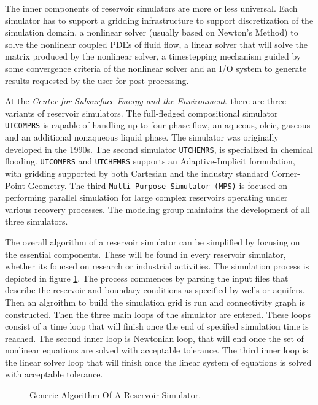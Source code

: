 The inner components of reservoir simulators are more or less universal. Each simulator has to support a 
gridding infrastructure to support discretization of the simulation domain, a nonlinear solver (usually based on Newton's Method) to 
solve the nonlinear coupled PDEs of fluid flow, a linear solver that will solve the matrix produced by the nonlinear solver, a timestepping
mechanism guided by some convergence criteria of the nonlinear solver and an I/O system to generate results requested by the user for post-processing.

At the \textit{Center for Subsurface Energy and the Environment}, there are three variants of reservoir simulators. The full-fledged compositional 
simulator \texttt{UTCOMPRS} is capable of handling up to four-phase flow, an aqueous, oleic, gaseous and an additional nonaqueous liquid phase. 
The simulator was originally developed in the 1990s\supercite{utcomp}. The second simulator \texttt{UTCHEMRS}, is specialized in chemical flooding.
\texttt{UTCOMPRS} and \texttt{UTCHEMRS} supports an Adaptive-Implicit formulation, with gridding supported by both Cartesian and the industry standard
Corner-Point Geometry. The third \texttt{Multi-Purpose Simulator (MPS)} is focused on performing parallel simulation for large complex reservoirs operating under
various recovery processes. The modeling group maintains the development of all three simulators. 

The overall algorithm of a reservoir simulator can be simplified by focusing on the essential components. These will be found in every reservoir simulator, whether
its foucsed on research or industrial activities. The simulation process is depicted in figure \ref{simulator}. The process commences by parsing the input files that describe the
reservoir and boundary conditions as specified by wells or aquifers. Then an algroithm to build the simulation grid is run and connectivity graph is constructed. Then the three main
loops of the simulator are entered. These loops consist of a time loop that will finish once the end of specified simulation time is reached. The second inner loop is Newtonian loop,
that will end once the set of nonlinear equations are solved with acceptable tolerance. The third inner loop is the linear solver loop that will finish once the linear system of equations
is solved with acceptable tolerance.

\begin{figure}[htb]
\raggedright
\resizebox{15cm}{!}{}
\caption{Generic Algorithm Of A Reservoir Simulator.}\label{simulator}
\end{figure}
\clearpage

